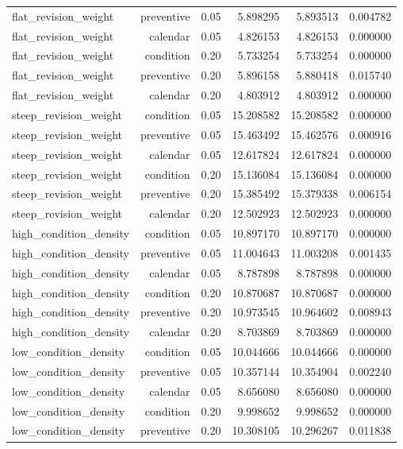 {\begin{longtable}{lrrrrr}
flat\_revision\_weight & preventive & 0.05 & 5.898295 & 5.893513 & 0.004782 \\
flat\_revision\_weight & calendar & 0.05 & 4.826153 & 4.826153 & 0.000000 \\
flat\_revision\_weight & condition & 0.20 & 5.733254 & 5.733254 & 0.000000 \\
flat\_revision\_weight & preventive & 0.20 & 5.896158 & 5.880418 & 0.015740 \\
flat\_revision\_weight & calendar & 0.20 & 4.803912 & 4.803912 & 0.000000 \\
steep\_revision\_weight & condition & 0.05 & 15.208582 & 15.208582 & 0.000000 \\
steep\_revision\_weight & preventive & 0.05 & 15.463492 & 15.462576 & 0.000916 \\
steep\_revision\_weight & calendar & 0.05 & 12.617824 & 12.617824 & 0.000000 \\
steep\_revision\_weight & condition & 0.20 & 15.136084 & 15.136084 & 0.000000 \\
steep\_revision\_weight & preventive & 0.20 & 15.385492 & 15.379338 & 0.006154 \\
steep\_revision\_weight & calendar & 0.20 & 12.502923 & 12.502923 & 0.000000 \\
high\_condition\_density & condition & 0.05 & 10.897170 & 10.897170 & 0.000000 \\
high\_condition\_density & preventive & 0.05 & 11.004643 & 11.003208 & 0.001435 \\
high\_condition\_density & calendar & 0.05 & 8.787898 & 8.787898 & 0.000000 \\
high\_condition\_density & condition & 0.20 & 10.870687 & 10.870687 & 0.000000 \\
high\_condition\_density & preventive & 0.20 & 10.973545 & 10.964602 & 0.008943 \\
high\_condition\_density & calendar & 0.20 & 8.703869 & 8.703869 & 0.000000 \\
low\_condition\_density & condition & 0.05 & 10.044666 & 10.044666 & 0.000000 \\
low\_condition\_density & preventive & 0.05 & 10.357144 & 10.354904 & 0.002240 \\
low\_condition\_density & calendar & 0.05 & 8.656080 & 8.656080 & 0.000000 \\
low\_condition\_density & condition & 0.20 & 9.998652 & 9.998652 & 0.000000 \\
low\_condition\_density & preventive & 0.20 & 10.308105 & 10.296267 & 0.011838 \\

\end{longtable}}
